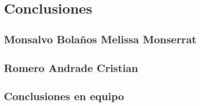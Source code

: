 \documentclass[table]{scrartcl}
\begin{document}
\section{Conclusiones}
\label{sec:orgdab2190}

\subsection*{Monsalvo Bolaños Melissa Monserrat}\label{sec:mons-bolan-melissa}

\subsection*{Romero Andrade Cristian}
\label{sec:romero-andr-crist}

\subsection*{Conclusiones en equipo}
\label{sec:concl-en-equipo}

\nocite{*}
\printbibliography{}
\end{document}
